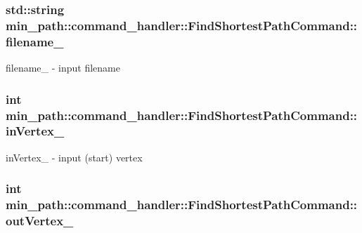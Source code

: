 \subsubsection[{\texorpdfstring{filename\+\_\+}{filename_}}]{\setlength{\rightskip}{0pt plus 5cm}std\+::string min\+\_\+path\+::command\+\_\+handler\+::\+Find\+Shortest\+Path\+Command\+::filename\+\_\+\hspace{0.3cm}{\ttfamily [private]}}\hypertarget{a00005_ab906462d177f146fcd35aa0011868eda_ab906462d177f146fcd35aa0011868eda}{}\label{a00005_ab906462d177f146fcd35aa0011868eda_ab906462d177f146fcd35aa0011868eda}


filename\+\_\+ -\/ input filename 

\subsubsection[{\texorpdfstring{in\+Vertex\+\_\+}{inVertex_}}]{\setlength{\rightskip}{0pt plus 5cm}int min\+\_\+path\+::command\+\_\+handler\+::\+Find\+Shortest\+Path\+Command\+::in\+Vertex\+\_\+\hspace{0.3cm}{\ttfamily [private]}}\hypertarget{a00005_ae0824ff65f78a73500e1bd4cb6521629_ae0824ff65f78a73500e1bd4cb6521629}{}\label{a00005_ae0824ff65f78a73500e1bd4cb6521629_ae0824ff65f78a73500e1bd4cb6521629}


in\+Vertex\+\_\+ -\/ input (start) vertex 

\subsubsection[{\texorpdfstring{out\+Vertex\+\_\+}{outVertex_}}]{\setlength{\rightskip}{0pt plus 5cm}int min\+\_\+path\+::command\+\_\+handler\+::\+Find\+Shortest\+Path\+Command\+::out\+Vertex\+\_\+\hspace{0.3cm}{\ttfamily [private]}}\hypertarget{a00005_aa46cc8f01d18634a14d309e88942afa8_aa46cc8f01d18634a14d309e88942afa8}{}\label{a00005_aa46cc8f01d18634a14d309e88942afa8_aa46cc8f01d18634a14d309e88942afa8}


